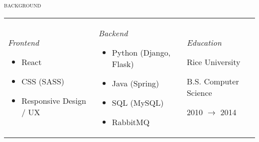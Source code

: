 \documentclass[11pt]{amsart}
\begin{document}
\bigskip
\textsc{background}

\begin{tabularx}{\textwidth}{@{}X X X@{}}
\textit{Frontend}
\bigskip
\begin{itemize}[noitemsep, leftmargin=2em, label=\raisebox{0.25ex}{\tiny$\bullet$}]
\item React
\item CSS (SASS)
\item Responsive Design / UX
\end{itemize}
& 
\textit{Backend} 
\bigskip
\begin{itemize}[noitemsep, leftmargin=2em, label=\raisebox{0.25ex}{\tiny$\bullet$}]
\item Python (Django, Flask)
\item Java (Spring)
\item SQL (MySQL)
\item RabbitMQ
\end{itemize}

 &
 \textit{Education} 
 
 \bigskip
Rice University

B.S. Computer Science
 
 2010 $\rightarrow$  2014  \\
\end{tabularx}
\endgroup
\end{document}

